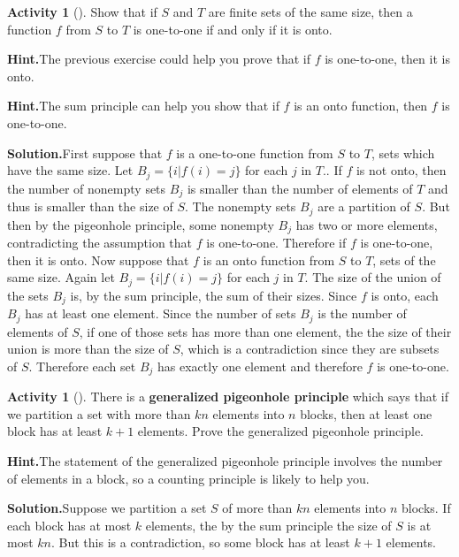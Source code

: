 \documentclass[10pt,]{book}
\newcommand{\terminology}[1]{\textbf{#1}}
\theoremstyle{plain}
\theoremstyle{definition}
\newtheorem{activity}[project]{Activity}
\numberwithin{equation}{chapter}
\begin{document}
\begin{activity}[]\label{activity-62}
Show that if \(S\) and \(T\) are finite sets of the same size, then a function \(f\) from \(S\) to \(T\) is one-to-one if and only if it is onto.%
\par\medskip\noindent%
\textbf{Hint.}\quad The previous exercise could help you prove that if \(f\) is one-to-one, then it is onto.%
\par\medskip\noindent%
\textbf{Hint.}\quad The sum principle can help you show that if \(f\) is an onto function, then \(f\) is one-to-one.%
\par\medskip\noindent%
\textbf{Solution.}\quad First suppose that \(f\) is a one-to-one function from \(S\) to \(T\), sets which have the same size. Let \(B_j=\{i|f(i)=j\}\) for each \(j\) in \(T\)..  If \(f\) is not onto, then the number of nonempty sets \(B_j\) is smaller than the number of elements of \(T\) and thus is smaller than the size of \(S\). The nonempty sets \(B_j\) are a partition of \(S\). But then by the pigeonhole principle, some nonempty \(B_j\) has two or more elements, contradicting the assumption that \(f\) is one-to-one. Therefore if \(f\) is one-to-one, then it is onto. Now suppose that \(f\) is an onto function from \(S\) to \(T\), sets of the same size. Again let \(B_j =\{i|f(i)=j\}\) for each \(j\) in \(T\). The size of the union of the sets \(B_j\) is, by the sum principle, the sum of their sizes. Since \(f\) is onto, each \(B_j\) has at least one element. Since the number of sets \(B_j\) is the number of elements of \(S\), if one of those sets has more than one element, the the size of their union is more than the size of \(S\), which is a contradiction since they are subsets of \(S\). Therefore each set \(B_j\) has exactly one element and therefore \(f\) is one-to-one.%
\end{activity}
\begin{activity}[]\label{activity-63}
There is a \terminology{generalized pigeonhole principle} which says that if we partition a set with more than \(kn\) elements into \(n\) blocks, then at least one block has at least \(k+1\) elements. Prove the generalized pigeonhole principle.%
\par\medskip\noindent%
\textbf{Hint.}\quad The statement of the generalized pigeonhole principle involves the number of elements in a block, so a counting principle is likely to help you.%
\par\medskip\noindent%
\textbf{Solution.}\quad Suppose we partition a set \(S\) of more than \(kn\) elements into \(n\) blocks. If each block has at most \(k\) elements, the by the sum principle the size of \(S\) is at most \(kn\). But this is a contradiction, so some block has at least \(k+1\) elements.%
\end{activity}
\end{document}
